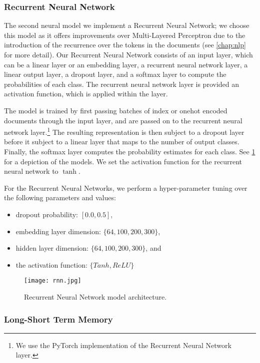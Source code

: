 \subsubsection{Recurrent Neural Network}

The second neural model we implement a Recurrent Neural Network; we choose this model as it offers improvements over Multi-Layered Perceptron due to the introduction of the recurrence over the tokens in the documents (see \cref{chap:nlp} for more detail). Our Recurrent Neural Network consists of an input layer, which can be a linear layer or an embedding layer, a recurrent neural network layer, a linear output layer, a dropout layer, and a softmax layer to compute the probabilities of each class. The recurrent neural network layer is provided an activation function, which is applied within the layer.

The model is trained by first passing batches of index or onehot encoded documents through the input layer, and are passed on to the recurrent neural network layer.\footnote{We use the PyTorch implementation of the Recurrent Neural Network layer.} The resulting representation is then subject to a dropout layer before it subject to a linear layer that maps to the number of output classes. Finally, the softmax layer computes the probability estimates for each class. See \cref{fig:liwc_rnn} for a depiction of the models. We set the activation function for the recurrent neural network to $\tanh$.

For the Recurrent Neural Networks, we perform a hyper-parameter tuning over the following parameters and values:

\begin{itemize}
  \item dropout probability: $[0.0, 0.5]$,
  \item embedding layer dimension: $\{64, 100, 200, 300\}$,
  \item hidden layer dimension: $\{64, 100, 200, 300\}$, and
   \item the activation function: $\{Tanh, ReLU\}$
\end{itemize}

\begin{figure}
  \centering
  \texttt{[image: rnn.jpg]}
  \caption{Recurrent Neural Network model architecture.}
  \label{fig:liwc_rnn}
\end{figure}

\subsubsection{Long-Short Term Memory}

